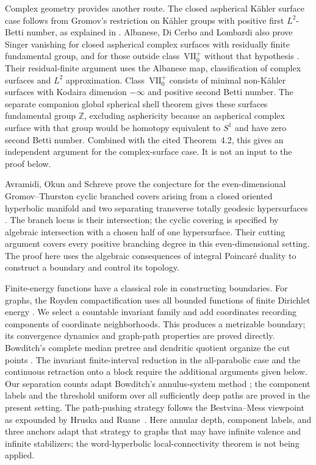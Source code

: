 Complex geometry provides another route. The closed aspherical K\"ahler
surface case follows from Gromov's restriction on K\"ahler groups with
positive first $L^2$-Betti number, as explained in
\cite[Theorem~4.1]{AlbaneseDiCerboLombardi2025}.
Albanese, Di Cerbo and Lombardi also prove Singer vanishing for closed
aspherical complex surfaces with residually finite fundamental group,
and for those outside class~$\mathrm{VII}_0^+$ without that hypothesis
\cite[Theorems~1.5 and~4.2]{AlbaneseDiCerboLombardi2025}.
Their residual-finite argument uses the Albanese map, classification
of complex surfaces and $L^2$ approximation.
Class~$\mathrm{VII}_0^+$ consists of minimal non-K\"ahler surfaces with
Kodaira dimension $-\infty$ and positive second Betti number.
The separate companion global spherical shell theorem
\cite[Theorem~1.1 and Corollary~1.2]{OpenAIGlobalSphericalShells2026}
gives these surfaces fundamental group $\mathbb Z$, excluding
asphericity because an aspherical complex surface with that group would be
homotopy equivalent to $S^1$ and have zero second Betti number.
Combined with the cited Theorem~4.2, this gives an
independent argument for the complex-surface case. It is not an input
to the proof below.

Avramidi, Okun and Schreve prove the conjecture for the
even-dimensional Gromov--Thurston cyclic branched covers arising from
a closed oriented hyperbolic manifold and two separating transverse
totally geodesic hypersurfaces \cite[Section~3, p.~2628]{AvramidiOkunSchreve2025}.
The branch locus is their intersection; the cyclic covering is
specified by algebraic intersection with a chosen half of one
hypersurface. Their cutting argument covers every positive branching degree
in this even-dimensional setting. The proof here uses the algebraic
consequences of integral Poincar\'e duality to construct a boundary and
control its topology.

Finite-energy functions have a classical role in constructing boundaries.
For graphs, the Royden compactification uses all bounded functions of
finite Dirichlet energy \cite[Section~4]{KellerLenzSchmidtWojciechowski2017}.
We select a countable invariant family and add coordinates recording
components of coordinate neighborhoods. This produces a metrizable
boundary; its convergence dynamics and graph-path properties are
proved directly. Bowditch's complete median pretree and dendritic
quotient organize the cut points
\cite{Bowditch1999Treelike,Bowditch1999Connected}.
The invariant finite-interval reduction in the all-parabolic case and
the continuous retraction onto a block require the additional arguments
given below. Our separation counts adapt Bowditch's annulus-system
method \cite[Sections~6--7]{Bowditch1998Topological}; the component
labels and the threshold uniform over all sufficiently deep paths are
proved in the present setting.
The path-pushing strategy follows the Bestvina--Mess viewpoint as
expounded by Hruska and Ruane~\cite[Sections~1 and~3]{HruskaRuane2024}.
Here annular depth, component labels, and three anchors adapt that
strategy to graphs that may have infinite valence and infinite
stabilizers; the word-hyperbolic local-connectivity theorem is not
being applied.

